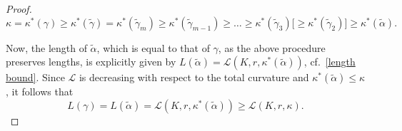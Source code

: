\documentclass[hidelinks,12pt,a4paper]{article}
\numberwithin{equation}{section}
\theoremstyle{plain}
\theoremstyle{definition}
\newcommand{\lm}[1]{\mathbb{L}^2(#1)}
\begin{document}
\begin{proof}

\begin{equation}
\label{eq: estimates summary}
    \kappa = \kappa^*(\gamma) \geq \kappa^*(\tilde\gamma)=\kappa^*(\tilde\gamma_m) \geq \kappa^*(\tilde\gamma_{m-1}) \geq \ldots \geq \kappa^*(\tilde\gamma_3) \big[ \geq \kappa^*(\tilde\gamma_2) 
    \big] \geq \kappa^*(\tilde \alpha). 
\end{equation}

Now, the length of $\tilde \alpha$, which is equal to that of $\gamma$, as the above procedure preserves lengths, is explicitly given by $L(\tilde \alpha)=\mathcal{L}(K,r,\kappa^*(\tilde \alpha))$, cf.\ \eqref{length bound}.
Since $\mathcal{L}$ is decreasing with respect to the total curvature and $\kappa^*(\tilde \alpha)\le \kappa$, it follows that 
\begin{equation}\label{eq: LengthIneqMainThm}
    L(\gamma)= L(\tilde \alpha)=\mathcal{L}(K,r,\kappa^*(\tilde \alpha))\ge \mathcal{L}(K,r,\kappa).
\end{equation}


\end{proof}
\end{document}
